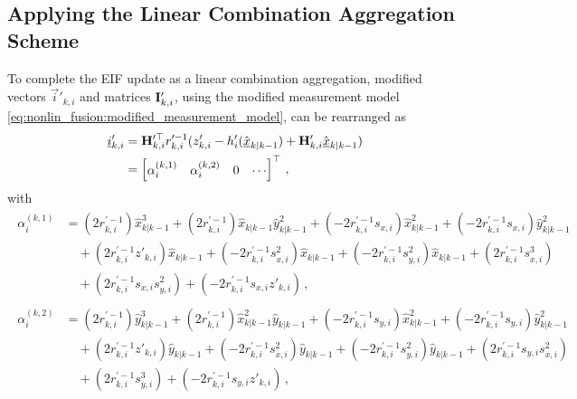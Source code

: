 \subsection{Applying the Linear Combination Aggregation Scheme}\label{subsec:nonlin_fusion:applying_lca_scheme}
To complete the EIF update as a linear combination aggregation, modified vectors $\vec{i}'_{k, i}$ and matrices ${{\mathbf{I}}}'_{k, i}$, using the modified measurement model \eqref{eq:nonlin_fusion:modified_measurement_model}, can be rearranged as
\begin{equation}\label{eq:nonlin_fusion:hrz_linear_comb}
    \begin{split}
        {\underline{i}}'_{k,i} &= {{\mathbf{H}}}_{k,i}^{\prime\top} r_{k,i}^{\prime-1}(z'_{k,i} - h'_i(\hat{{\underline{x}}}_{k|k-1}) + {{\mathbf{H}}}'_{k,i}\hat{{\underline{x}}}_{k|k-1}) \\
        &= 
        \begin{bmatrix}
            \alpha_i^{(k,1)} & \alpha_i^{(k,2)} & 0 & \cdots
        \end{bmatrix}^\top\,,
    \end{split}
\end{equation}
with
\begin{align*}
    \begin{split}
        \alpha_i^{(k,1)} &= (2r_{k,i}^{\prime-1})\hat{x}_{k|k-1}^3 + (2r_{k,i}^{\prime-1})\hat{x}_{k|k-1}\hat{y}_{k|k-1}^2+ (-2r_{k,i}^{\prime-1}s_{x,i})\hat{x}_{k|k-1}^2 + (-2r_{k,i}^{\prime-1}s_{x,i})\hat{y}_{k|k-1}^2 \\
        &\quad+ (2r_{k,i}^{\prime-1}z'_{k,i})\hat{x}_{k|k-1} + (-2r_{k,i}^{\prime-1}s_{x,i}^2)\hat{x}_{k|k-1}+ (-2r_{k,i}^{\prime-1}s_{y,i}^2)\hat{x}_{k|k-1} + (2r_{k,i}^{\prime-1}s_{x,i}^3) \\
        &\quad+ (2r_{k,i}^{\prime-1}s_{x,i}s_{y,i}^2) + (-2r_{k,i}^{\prime-1}s_{x,i} z'_{k,i})\,,
    \end{split}\\
    \begin{split}
        \alpha_i^{(k,2)} &= (2r_{k,i}^{\prime-1})\hat{y}_{k|k-1}^3 + (2r_{k,i}^{\prime-1})\hat{x}_{k|k-1}^2\hat{y}_{k|k-1}+ (-2r_{k,i}^{\prime-1}s_{y,i})\hat{x}_{k|k-1}^2 + (-2r_{k,i}^{\prime-1}s_{y,i})\hat{y}_{k|k-1}^2 \\
        &\quad+ (2r_{k,i}^{\prime-1}z'_{k,i})\hat{y}_{k|k-1} + (-2r_{k,i}^{\prime-1}s_{x,i}^2)\hat{y}_{k|k-1}+ (-2r_{k,i}^{\prime-1}s_{y,i}^2)\hat{y}_{k|k-1} + (2r_{k,i}^{\prime-1}s_{y,i}s_{x,i}^2) \\
        &\quad+ (2r_{k,i}^{\prime-1}s_{y,i}^3) + (-2r_{k,i}^{\prime-1}s_{y,i}z'_{k,i})\,,
    \end{split}
\end{align*}
